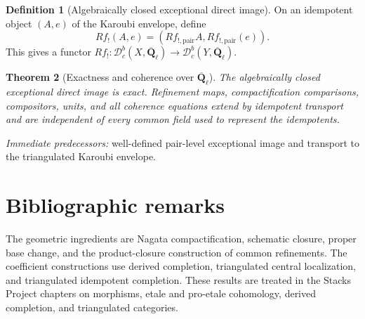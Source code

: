 \documentclass[10pt]{article}
\newtheorem{theorem}{Theorem}[section]
\theoremstyle{definition}
\newtheorem{definition}[theorem]{Definition}
\newcommand{\Qlb}{\overline{\mathbf Q}_\ell}
\newcommand{\Dbc}{\mathcal D^b_c}
\newcommand{\pred}[1]{\par\smallskip\begingroup\footnotesize\raggedright
\emph{Immediate predecessors:} #1.\par\endgroup}
\begin{document}
\begin{definition}[Algebraically closed exceptional direct image]
On an idempotent object \((A,e)\) of the Karoubi envelope, define
\[
 Rf_!(A,e)=
 (Rf_{!,\mathrm{pair}}A,Rf_{!,\mathrm{pair}}(e)).
\]
This gives a functor
\(Rf_!: \Dbc(X,\Qlb)\to\Dbc(Y,\Qlb)\).
\end{definition}

\begin{theorem}[Exactness and coherence over
\texorpdfstring{\(\Qlb\)}{Qbar-l}]
The algebraically closed exceptional direct image is exact.  Refinement
maps, compactification comparisons, compositors, units, and all coherence
equations extend by idempotent transport and are independent of every
common field used to represent the idempotents.
\end{theorem}
\pred{well-defined pair-level exceptional image and transport to the triangulated Karoubi envelope}

\section{Bibliographic remarks}

The geometric ingredients are Nagata compactification, schematic closure,
proper base change, and the product-closure construction of common
refinements.  The coefficient constructions use derived completion,
triangulated central localization, and triangulated idempotent completion.
These results are treated in the Stacks Project chapters on morphisms,
etale and pro-etale cohomology, derived completion, and triangulated
categories.
\end{document}

